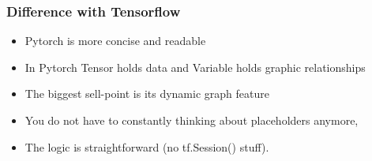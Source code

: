 








\begin{frame}[fragile] \frametitle{Difference with Tensorflow}
\begin{itemize}
\item Pytorch is more concise and readable
\item In Pytorch Tensor holds data and Variable holds graphic relationships
\item The biggest sell-point is its dynamic graph feature
\item You do not have to constantly thinking about placeholders anymore, 
\item The logic is straightforward (no tf.Session() stuff).
\end{itemize}

\end{frame}

